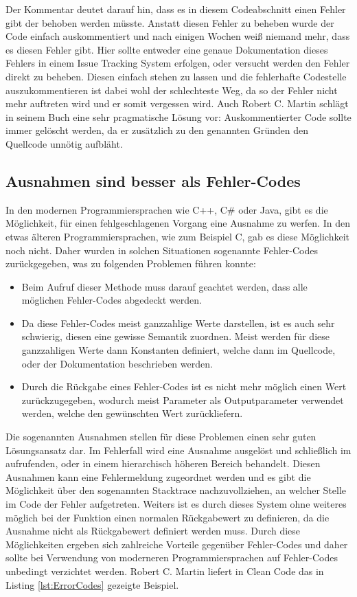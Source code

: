 \SuperPar Der Kommentar deutet darauf hin, dass es in diesem Codeabschnitt einen Fehler gibt der behoben werden müsste. Anstatt diesen Fehler zu beheben wurde der Code einfach auskommentiert und nach einigen Wochen weiß niemand mehr, dass es diesen Fehler gibt. Hier sollte entweder eine genaue Dokumentation dieses Fehlers in einem Issue Tracking System erfolgen, oder versucht werden den Fehler direkt zu beheben. Diesen einfach stehen zu lassen und die fehlerhafte Codestelle auszukommentieren ist dabei wohl der schlechteste Weg, da so der Fehler nicht mehr auftreten wird und er somit vergessen wird. Auch Robert C. Martin schlägt in seinem Buch eine sehr pragmatische Lösung vor: Auskommentierter Code sollte immer gelöscht werden, da er zusätzlich zu den genannten Gründen den Quellcode unnötig aufbläht.

\subsection{Ausnahmen sind besser als Fehler-Codes}
In den modernen Programmiersprachen wie C++, C\# oder Java, gibt es die Möglichkeit, für einen fehlgeschlagenen Vorgang eine Ausnahme zu werfen. In den etwas älteren Programmiersprachen, wie zum Beispiel C, gab es diese Möglichkeit noch nicht. Daher wurden in solchen Situationen sogenannte Fehler-Codes zurückgegeben, was zu folgenden Problemen führen konnte:

\begin{itemize}
	\item Beim Aufruf dieser Methode muss darauf geachtet werden, dass alle möglichen Fehler-Codes abgedeckt werden. 
	\item Da diese Fehler-Codes meist ganzzahlige Werte darstellen, ist es auch sehr schwierig, diesen eine gewisse Semantik zuordnen. Meist werden für diese ganzzahligen Werte dann Konstanten definiert, welche dann im Quellcode, oder der Dokumentation beschrieben werden. 
	\item Durch die Rückgabe eines Fehler-Codes ist es nicht mehr möglich einen Wert zurückzugegeben, wodurch meist Parameter als Outputparameter verwendet werden, welche den gewünschten Wert zurückliefern.
\end{itemize}

\SuperPar Die sogenannten Ausnahmen stellen für diese Problemen einen sehr guten Lösungsansatz dar. Im Fehlerfall wird eine Ausnahme ausgelöst und schließlich im aufrufenden, oder in einem hierarchisch höheren Bereich behandelt. Diesen Ausnahmen kann eine Fehlermeldung zugeordnet werden und es gibt die Möglichkeit über den sogenannten Stacktrace nachzuvollziehen, an welcher Stelle im Code der Fehler aufgetreten. Weiters ist es durch dieses System ohne weiteres möglich bei der Funktion einen normalen Rückgabewert zu definieren, da die Ausnahme nicht als Rückgabewert definiert werden muss. Durch diese Möglichkeiten ergeben sich zahlreiche Vorteile gegenüber Fehler-Codes und daher sollte bei Verwendung von moderneren Programmiersprachen auf Fehler-Codes unbedingt verzichtet werden. Robert C. Martin liefert in Clean Code \cite[Seite 78]{Martin2008} das in Listing \ref{lst:ErrorCodes} gezeigte Beispiel.

